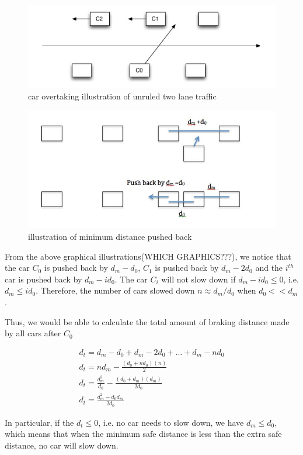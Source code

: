 \begin{figure}
\includegraphics[scale = 0.5]{plot/P1}
\caption{car overtaking illustration of unruled two lane traffic}
\end{figure}

\begin{figure}
\includegraphics[scale = 0.5]{plot/P2}
\caption{illustration of minimum distance pushed back}
\end{figure}

From the above graphical illustrations(WHICH GRAPHICS???), we notice that the car $C_0$ is pushed back by $d_m-d_0$, $C_1$ is pushed back by $d_m-2d_0$ and the $i^{th}$ car is pushed back by $d_m-id_0$. The car $C_i$ will not slow down if $d_m-id_0\le 0$, i.e. $d_m \le id_0$. Therefore, the number of cars slowed down $n \approx d_m/d_0$ when $d_0 << d_m$. 

Thus, we would be able to calculate the total amount of braking distance made by all cars after $C_0$

\begin{align}
&d_t = d_m-d_0 + d_m-2d_0 + \dots + d_m - nd_0 & \\
&d_t = nd_m-\frac{(d_0+nd_0)(n)}{2}&\\
&d_t = \frac{d_m^2}{d_0}-\frac{(d_0+d_m)(d_m)}{2d_0}&\\
&d_t = \frac{d_m^2-d_0d_m}{2d_0}
\end{align}

In particular, if the $d_t \le 0$, i.e. no car needs to slow down, we have $d_m\le d_0$, which means that when the minimum safe distance is less than the extra safe distance, no car will slow down. 

